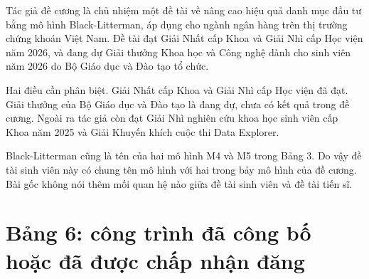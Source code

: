 Tác giả đề cương là chủ nhiệm một đề tài về nâng cao hiệu quả danh mục đầu tư bằng mô hình Black-Litterman, áp dụng cho ngành ngân hàng trên thị trường chứng khoán Việt Nam. Đề tài đạt Giải Nhất cấp Khoa và Giải Nhì cấp Học viện năm 2026, và đang dự Giải thưởng Khoa học và Công nghệ dành cho sinh viên năm 2026 do Bộ Giáo dục và Đào tạo tổ chức.

Hai điều cần phân biệt. Giải Nhất cấp Khoa và Giải Nhì cấp Học viện đã đạt. Giải thưởng của Bộ Giáo dục và Đào tạo là đang dự, chưa có kết quả trong đề cương. Ngoài ra tác giả còn đạt Giải Nhì nghiên cứu khoa học sinh viên cấp Khoa năm 2025 và Giải Khuyến khích cuộc thi Data Explorer.

Black-Litterman cũng là tên của hai mô hình M4 và M5 trong Bảng 3. Do vậy đề tài sinh viên này có chung tên mô hình với hai trong bảy mô hình của đề cương. Bài gốc không nói thêm mối quan hệ nào giữa đề tài sinh viên và đề tài tiến sĩ.

\section{Bảng 6: công trình đã công bố hoặc đã được chấp nhận đăng}

